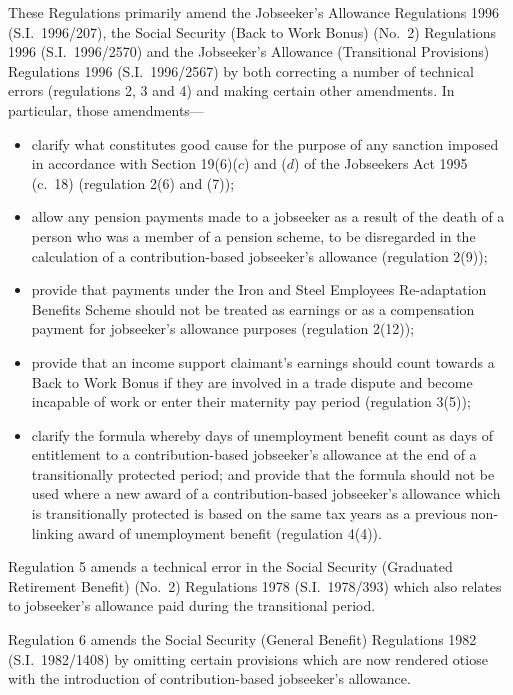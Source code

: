 \documentclass[12pt,a4paper]{article}
\begin{document}
These Regulations primarily amend the Jobseeker’s Allowance Regulations 1996 (S.I.\ 1996/207), the Social Security (Back to Work Bonus) (No.\ 2) Regulations 1996 (S.I.\ 1996/2570) and the Jobseeker’s Allowance (Transitional Provisions) Regulations 1996 (S.I.\ 1996/2567) by both correcting a number of technical errors (regulations 2, 3 and 4) and making certain other amendments. In particular, those amendments—
\begin{itemize}
\item    clarify what constitutes good cause for the purpose of any sanction imposed in accordance with Section 19(6)($c$)  and ($d$)  of the Jobseekers Act 1995 (c.\ 18) (regulation 2(6) and (7));

\item    allow any pension payments made to a jobseeker as a result of the death of a person who was a member of a pension scheme, to be disregarded in the calculation of a contribution-based jobseeker’s allowance (regulation 2(9));

\item    provide that payments under the Iron and Steel Employees Re-adaptation Benefits Scheme should not be treated as earnings or as a compensation payment for jobseeker’s allowance purposes (regulation 2(12));

\item    provide that an income support claimant’s earnings should count towards a Back to Work Bonus if they are involved in a trade dispute and become incapable of work or enter their maternity pay period (regulation 3(5));

\item    clarify the formula whereby days of unemployment benefit count as days of entitlement to a contribution-based jobseeker’s allowance at the end of a transitionally protected period; and provide that the formula should not be used where a new award of a contribution-based jobseeker’s allowance which is transitionally protected is based on the same tax years as a previous non-linking award of unemployment benefit (regulation 4(4)). 
\end{itemize}

Regulation 5 amends a technical error in the Social Security (Graduated Retirement Benefit) (No.\ 2) Regulations 1978 (S.I.\ 1978/393) which also relates to jobseeker’s allowance paid during the transitional period.

Regulation 6 amends the Social Security (General Benefit) Regulations 1982 (S.I.\ 1982/1408) by omitting certain provisions which are now rendered otiose with the introduction of contribution-based jobseeker’s allowance.
\end{document}
